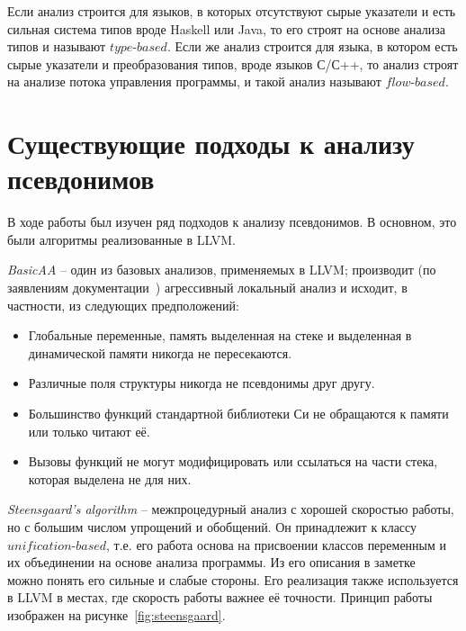 \begin{mydefinition}
Если анализ строится для языков, в которых отсутствуют сырые указатели и есть сильная система типов вроде Haskell или Java, то его строят на основе анализа типов и называют $type$-$based$. Если же анализ строится для языка, в котором есть сырые указатели и преобразования типов, вроде языков С/С++, то анализ строят на анализе потока управления программы, и такой анализ называют $flow$-$based$.
\end{mydefinition}

\section{Существующие подходы к анализу псевдонимов}

В ходе работы был изучен ряд подходов к анализу псевдонимов. В основном, это были алгоритмы реализованные в LLVM. 

\textit{BasicAA} -- один из базовых анализов, применяемых в LLVM; производит (по заявлениям документации~\autocite{LLVMAAI}) агрессивный локальный анализ и исходит, в частности, из следующих предположений:
\begin{itemize}
\item Глобальные переменные, память выделенная на стеке и выделенная в динамической памяти никогда не пересекаются.
\item Различные поля структуры никогда не псевдонимы друг другу.
\item Большинство функций стандартной библиотеки Си не обращаются к памяти или только читают её.
\item Вызовы функций не могут модифицировать или ссылаться на части стека, которая выделена не для них.
\end{itemize}

\textit{Steensgaard’s algorithm} -- межпроцедурный анализ с хорошей скоростью работы, но с большим числом упрощений и обобщений. Он принадлежит к классу $unification$-$based$, т.е. его работа основа на присвоении классов переменным и их объединении на основе анализа программы. Из его описания в заметке~\autocite{SteensgaardsNote} можно понять его сильные и слабые стороны. Его реализация также используется в LLVM в местах, где скорость работы важнее её точности. Принцип работы изображен на рисунке~\ref{fig:steensgaard}.

